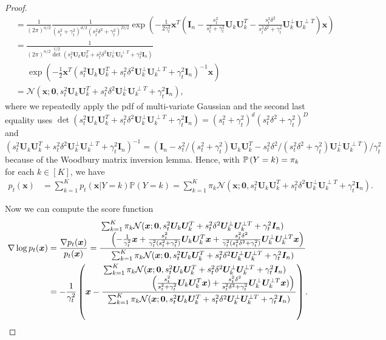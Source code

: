 \begin{proof}
\begin{align*}
        & = \frac{1}{(2\pi)^{n/2}}\frac{1}{(s_t^2 + \gamma_t^2)^{d/2}(s_t^2\delta^2 + \gamma_t^2)^{D/2}}\exp\left(-\frac{1}{2\gamma_t^2}\bm x^T\left(\bm I_n - \frac{s_t^2}{s_t^2+\gamma_t^2} \bm U_k \bm U_k^{T} - \frac{s_t^2 \delta^2}{s_t^2 \delta^2 +\gamma_t^2} \bm U_k^{\perp} \bm U_k^{\perp T} \right)\bm x \right) \\
        & = \frac{1}{(2\pi)^{n/2}\det^{1/2}(s_t^2\bm U_k\bm U_k^{T} + s_t^2 \delta^2\bm U_k^{\perp}\bm U_k^{\perp T} + \gamma_t^2\bm I_n)}\\
        &\;\;\;\;\;\exp\left( -\frac{1}{2}\bm x^T\left(s_t^2\bm U_k\bm U_k^{T} +s_t^2\delta^2\bm U_k^{\perp}\bm U_k^{\perp T}  + \gamma_t^2\bm I_n \right)^{-1}\bm x \right) \\
        & = \mathcal{N}(\bm x; \bm 0, s_t^2\bm U_k\bm U_k^{T} + s_t^2 \delta^2\bm U_k^{\perp}\bm U_k^{\perp T} + \gamma_t^2\bm I_n),
    \end{align*}
where we repeatedly apply the pdf of multi-variate Gaussian and the second last equality uses $\det(s_t^2\bm U_k\bm U_k^{T} + s_t^2 \delta^2\bm U_k^{\perp}\bm U_k^{\perp T} + \gamma_t^2\bm I_n) = (s_t^2 + \gamma_t^2)^{d}(s_t^2\delta^2 + \gamma_t^2)^{D}$ and $(s_t^2\bm U_k\bm U_k^{T} + s_t^2 \delta^2\bm U_k^{\perp}\bm U_k^{\perp T} + \gamma_t^2\bm I_n)^{-1} = \left(\bm I_n - s_t^2/(s_t^2+\gamma_t^2) \bm U_k\bm U_k^{T} - s_t^2\delta^2/(s_t^2\delta^2+\gamma_t^2) \bm U_k^{\perp}\bm U_k^{\perp T} \right)/\gamma_t^2$ because of the Woodbury matrix inversion lemma. Hence, with $\P{Y = k} = \pi_k$ for each $k \in [K]$, we have
    \begin{align*}
        p_t(\bm x) & = \sum_{k=1}^K p_{t}(\bm x\vert Y = k) \mathbb{P}(Y = k) = \sum_{k=1}^K \pi_k \mathcal{N}(\bm x; \bm 0, s_t^2\bm U_k\bm U_k^{T} + s_t^2\delta^2\bm U_k^{\perp}\bm U_k^{\perp T} + \gamma_t^2\bm I_n).
    \end{align*}

Now we can compute the score function
\begin{align*}
    \nabla \log p_t(\bm x) & = \frac{\nabla p_t(\bm x)}{p_t(\bm x)} =  \frac{\splitfrac{\sum_{k=1}^K \pi_k \mathcal{N}(\bm x; \bm 0, s_t^2\bm U_k\bm U_k^{T} + s_t^2\delta^2\bm U_k^{\perp}\bm U_k^{\perp T} + \gamma_t^2\bm I_n)}{\left( -\frac{1}{\gamma_t^2}\bm x + \frac{s_t^2}{\gamma_t^2(s_t^2 + \gamma_t^2)} \bm U_k\bm U_k^{T}  \bm x + \frac{s_t^2 \delta^2}{\gamma_t^2(s_t^2\delta^2 + \gamma_t^2)} \bm U_k^{\perp}\bm U_k^{\perp T}  \bm x  \right)}}{\sum_{k=1}^K \pi_k \mathcal{N}(\bm x; \bm 0, s_t^2\bm U_k\bm U_k^{T} + s_t^2\delta^2\bm U_k^{\perp}\bm U_k^{\perp T} + \gamma_t^2\bm I_n)} \\
    & = -\frac{1}{\gamma_t^2} \left( \bm x -\frac{\splitfrac{\sum_{k=1}^K\pi_k \mathcal{N}(\bm x; \bm 0, s_t^2\bm U_k\bm U_k^{T} + s_t^2\delta^2\bm U_k^{\perp}\bm U_k^{\perp T} + \gamma_t^2\bm I_n)}{\left( \frac{s_t^2}{s_t^2 + \gamma_t^2} \bm U_k\bm U_k^{T}  \bm x ) + \frac{s_t^2 \delta^2}{s_t^2 \delta^2 + \gamma_t^2} \bm U_k^{\perp}\bm U_k^{\perp T}  \bm x ) \right)}}{\sum_{k=1}^K \pi_k \mathcal{N}(\bm x; \bm 0, s_t^2\bm U_k\bm U_k^{T} + s_t^2\delta^2\bm U_k^{\perp}\bm U_k^{\perp T} + \gamma_t^2\bm I_n)}  \right). 
\end{align*}


\end{proof}
